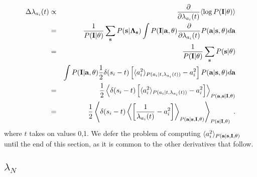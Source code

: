 \documentclass[12pt]{article}
\newcommand{\params}{\theta}
\newcommand{\ba}{{\bf a}}
\newcommand{\bs}{{\bf s}}
\newcommand{\bI}{{\bf I}}
\newcommand{\bLambdas}{{\bf \Lambda_s}}
\newcommand{\pd}[1]{\frac{\partial}{\partial #1}}
\begin{document}
\begin{eqnarray}
\Delta \lambda_{a_i}(t) & \propto &
   \pd{\lambda_{a_i}(t)} \langle \log P(\bI|\params) \rangle \\
 & = & \frac{1}{P(\bI|\params)} \sum_{\bs} P(\bs|\bLambdas) 
        \int P(\bI|\ba,\params) 
             \pd{\lambda_{a_i}(t)} P(\ba|\bs,\params) d\ba \\
 & = & \frac{1}{P(\bI|\params)} \sum_{\bs} P(\bs|\params) \\
 &   & \int P(\bI|\ba,\params) \frac{1}{2} \delta(s_i-t) 
        \left[ \langle a_i^2 \rangle_{P(a_i|t,\lambda_{a_i}(t))} - a_i^2 \right]
         P(\ba|\bs,\params) d\ba \\
 & = & \frac{1}{2} \left\langle \delta(s_i-t) 
       \left[ \langle a_i^2 \rangle_{P(a_i|t,\lambda_{a_i}(t))} - a_i^2 \right]
       \right\rangle_{P(\ba,\bs|\bI,\params)} \\
 & = & \frac{1}{2} \left\langle \delta(s_i-t) \left\langle
       \left[ \frac{1}{\lambda_{a_i}(t)} - a_i^2 \right]
                                         \right\rangle_{P(\ba|\bs,\bI,\params)}
                     \right\rangle_{P(\bs|\bI,\params)} \; .
\end{eqnarray}
where $t$ takes on values 0,1.  We defer the problem of computing
$\langle a_i^2 \rangle_{P(\ba|\bs,\bI,\params)}$ until the end of this
section, as it is common to the other derivatives that follow.

\subsection{$\lambda_N$}
\end{document}
